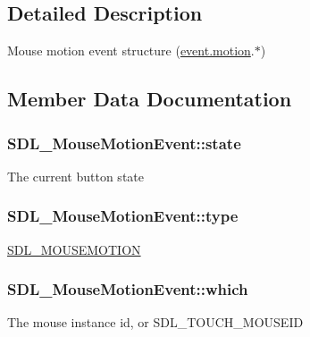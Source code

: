 \subsection{Detailed Description}
Mouse motion event structure (\hyperlink{union_s_d_l___event_ac3c89e190faacbe84280cd539453bab6}{event.\+motion}.$\ast$) 

\subsection{Member Data Documentation}
\hypertarget{struct_s_d_l___mouse_motion_event_a3f6e9bad9d959b824881ba09e05b7024}{}
\subsubsection[{state}]{ S\+D\+L\+\_\+\+Mouse\+Motion\+Event\+::state}\label{struct_s_d_l___mouse_motion_event_a3f6e9bad9d959b824881ba09e05b7024}
The current button state \hypertarget{struct_s_d_l___mouse_motion_event_a431dd28cd6db6a7335cf633dbeb80cfb}{}
\subsubsection[{type}]{ S\+D\+L\+\_\+\+Mouse\+Motion\+Event\+::type}\label{struct_s_d_l___mouse_motion_event_a431dd28cd6db6a7335cf633dbeb80cfb}
\hyperlink{_s_d_l__events_8h_a3b589e89be6b35c02e0dd34a55f3fccaa04c436ef80fef38fb77a89e0e9124c30}{S\+D\+L\+\_\+\+M\+O\+U\+S\+E\+M\+O\+T\+I\+O\+N} \hypertarget{struct_s_d_l___mouse_motion_event_a6f04c17b4305683915e2fd2dc3c36dbc}{}
\subsubsection[{which}]{ S\+D\+L\+\_\+\+Mouse\+Motion\+Event\+::which}\label{struct_s_d_l___mouse_motion_event_a6f04c17b4305683915e2fd2dc3c36dbc}
The mouse instance id, or S\+D\+L\+\_\+\+T\+O\+U\+C\+H\+\_\+\+M\+O\+U\+S\+E\+I\+D \hypertarget{struct_s_d_l___mouse_motion_event_aa9976725242ada93a9e18e7fdf5796e6}{}
